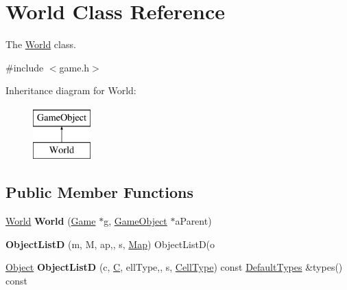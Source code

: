 \hypertarget{class_world}{\section{\-World \-Class \-Reference}
\label{class_world}
}


\-The \hyperlink{class_world}{\-World} class.  




{\ttfamily \#include $<$game.\-h$>$}

\-Inheritance diagram for \-World\-:\begin{figure}[H]
\begin{center}
\leavevmode
\includegraphics[height=2.000000cm]{class_world}
\end{center}
\end{figure}
\subsection*{\-Public \-Member \-Functions}
\begin{DoxyCompactItemize}
\item 
\hypertarget{class_world_aaf77452519079d4370a5f36d5a511006}{\hyperlink{class_world}{\-World} {\bfseries \-World} (\hyperlink{class_game}{\-Game} $\ast$g, \hyperlink{class_game_object}{\-Game\-Object} $\ast$a\-Parent)}\label{class_world_aaf77452519079d4370a5f36d5a511006}

\item 
\hypertarget{class_world_a7fe6abb143814e0f87145648982f46af}{{\bfseries \-Object\-List\-D} (m, \-M, ap,, s, \hyperlink{class_map}{\-Map}) \-Object\-List\-D(o}\label{class_world_a7fe6abb143814e0f87145648982f46af}

\item 
\hypertarget{class_world_a43e1700cc297a1ea2522afa7d477109c}{\hyperlink{class_object}{\-Object} {\bfseries \-Object\-List\-D} (c, \hyperlink{gameobject_8h_af50e2bbaaebe8da60a8d514fca706273}{\-C}, ell\-Type,, s, \hyperlink{class_cell_type}{\-Cell\-Type}) const \hyperlink{class_default_types}{\-Default\-Types} \&types() const }\label{class_world_a43e1700cc297a1ea2522afa7d477109c}

\end{DoxyCompactItemize}
